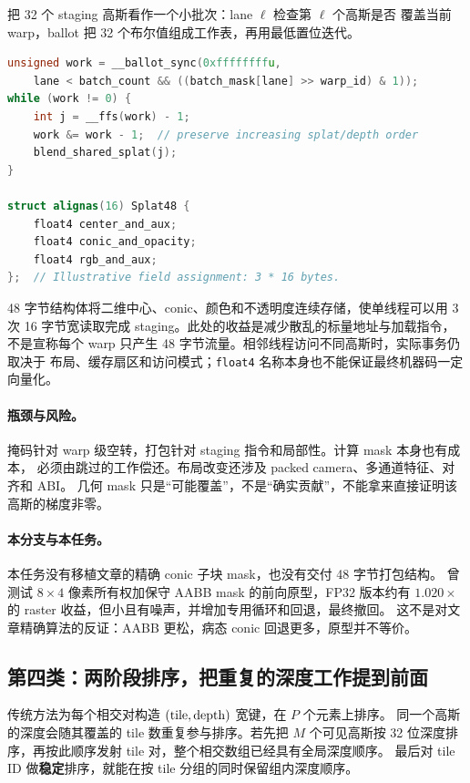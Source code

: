 把 32 个 staging 高斯看作一个小批次：lane $\ell$ 检查第 $\ell$ 个高斯是否
覆盖当前 warp，ballot 把 32 个布尔值组成工作表，再用最低置位迭代。

\begin{lstlisting}[language=C++,basicstyle=\ttfamily\small,breaklines=true]
unsigned work = __ballot_sync(0xffffffffu,
    lane < batch_count && ((batch_mask[lane] >> warp_id) & 1));
while (work != 0) {
    int j = __ffs(work) - 1;
    work &= work - 1;  // preserve increasing splat/depth order
    blend_shared_splat(j);
}

struct alignas(16) Splat48 {
    float4 center_and_aux;
    float4 conic_and_opacity;
    float4 rgb_and_aux;
};  // Illustrative field assignment: 3 * 16 bytes.
\end{lstlisting}

48 字节结构体将二维中心、conic、颜色和不透明度连续存储，使单线程可以用
3 次 16 字节宽读取完成 staging。此处的收益是减少散乱的标量地址与加载指令，
不是宣称每个 warp 只产生 48 字节流量。相邻线程访问不同高斯时，实际事务仍取决于
布局、缓存扇区和访问模式；\texttt{float4} 名称本身也不能保证最终机器码一定向量化。

\paragraph{瓶颈与风险。}
掩码针对 warp 级空转，打包针对 staging 指令和局部性。计算 mask 本身也有成本，
必须由跳过的工作偿还。布局改变还涉及 packed camera、多通道特征、对齐和 ABI。
几何 mask 只是``可能覆盖''，不是``确实贡献''，不能拿来直接证明该高斯的梯度非零。

\paragraph{本分支与本任务。}
本任务没有移植文章的精确 conic 子块 mask，也没有交付 48 字节打包结构。
曾测试 $8\times4$ 像素所有权加保守 AABB mask 的前向原型，FP32 版本约有
$1.020\times$ 的 raster 收益，但小且有噪声，并增加专用循环和回退，最终撤回。
这不是对文章精确算法的反证：AABB 更松，病态 conic 回退更多，原型并不等价。

\subsection{第四类：两阶段排序，把重复的深度工作提到前面}

传统方法为每个相交对构造 $({\rm tile},{\rm depth})$ 宽键，在 $P$ 个元素上排序。
同一个高斯的深度会随其覆盖的 tile 数重复参与排序。若先把 $M$ 个可见高斯按
32 位深度排序，再按此顺序发射 tile 对，整个相交数组已经具有全局深度顺序。
最后对 tile ID 做\textbf{稳定}排序，就能在按 tile 分组的同时保留组内深度顺序。

